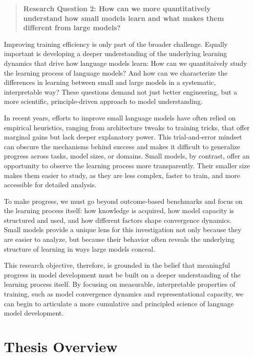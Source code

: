 \begin{quote}
    \textbf{Research Question 2: How can we more quantitatively understand how small models learn and what makes them different from large models?}
\end{quote}

Improving training efficiency is only part of the broader challenge. Equally important is developing a deeper understanding of the underlying learning dynamics that drive how language models learn: How can we quantitaively study the learning process of language models? And how can we characterize the differences in learning between small and large models in a systematic, interpretable way? These questions demand not just better engineering, but a more scientific, principle-driven approach to model understanding.

In recent years, efforts to improve small language models have often relied on empirical heuristics, ranging from architecture tweaks to training tricks, that offer marginal gains but lack deeper explanatory power. This trial-and-error mindset can obscure the mechanisms behind success and makes it difficult to generalize progress across tasks, model sizes, or domains. Small models, by contrast, offer an opportunity to observe the learning process more transparently. Their smaller size makes them easier to study, as they are less complex, faster to train, and more accessible for detailed analysis.

To make progress, we must go beyond outcome-based benchmarks and focus on the learning process itself: how knowledge is acquired, how model capacity is structured and used, and how different factors shape convergence dynamics. Small models provide a unique lens for this investigation not only because they are easier to analyze, but because their behavior often reveals the underlying structure of learning in ways large models conceal.

This research objective, therefore, is grounded in the belief that meaningful progress in model development must be built on a deeper understanding of the learning process itself. By focusing on measurable, interpretable properties of training, such as model convergence dynamics and representational capacity, we can begin to articulate a more cumulative and principled science of language model development.

\section*{Thesis Overview}

